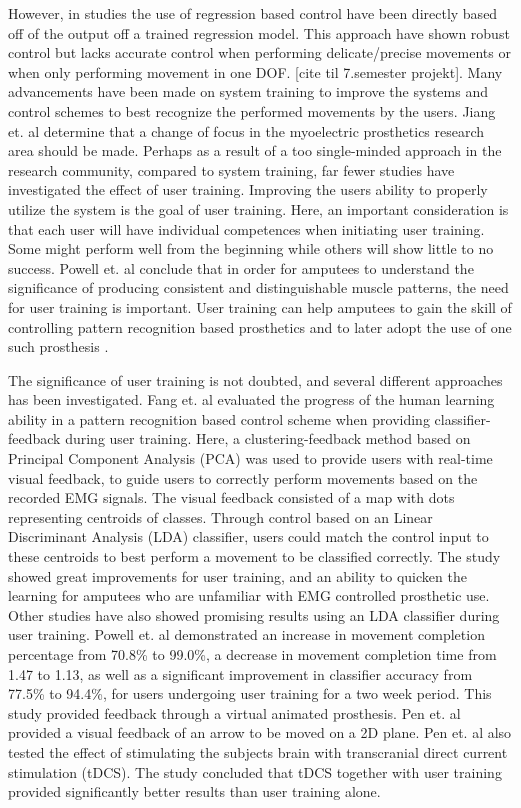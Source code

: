 However, in studies the use of regression based control have been directly based off of the output off a trained regression model. This approach have shown robust control but lacks accurate control when performing delicate/precise movements or when only performing movement in one DOF. [cite til 7.semester projekt]. Many advancements have been made on system training to improve the systems and control schemes to best recognize the performed movements by the users. Jiang et. al \cite{Jiang2012} determine that a change of focus in the myoelectric prosthetics research area should be made. Perhaps as a result of a too single-minded approach in the research community, compared to system training, far fewer studies have investigated the effect of user training. 
Improving the users ability to properly utilize the system is the goal of user training. Here, an important consideration is that each user will have individual competences when initiating user training. Some might perform well from the beginning while others will show little to no success. \cite{Powell2013} Powell et. al \cite{Powell2013} conclude that in order for amputees to understand the significance of producing consistent and distinguishable muscle patterns, the need for user training is important. User training can help amputees to gain the skill of controlling pattern recognition based prosthetics and to later adopt the use of one such prosthesis \cite{Powell2013}.

The significance of user training is not doubted, and several different approaches has been investigated.
Fang et. al \cite{Fang2017} evaluated the progress of the human learning ability in a pattern recognition based control scheme when providing classifier-feedback during user training. Here, a clustering-feedback method based on Principal Component Analysis (PCA) was used to provide users with real-time visual feedback, to guide users to correctly perform movements based on the recorded EMG signals. The visual feedback consisted of a map with dots representing centroids of classes. Through control based on an Linear Discriminant Analysis (LDA) classifier, users could match the control input to these centroids to best perform a movement to be classified correctly. The study showed great improvements for user training, and an ability to quicken the learning for amputees who are unfamiliar with EMG controlled prosthetic use. \cite{Fang2017}
Other studies have also showed promising results using an LDA classifier during user training. Powell et. al \cite{Powell2014} demonstrated an increase in movement completion percentage from 70.8\% to 99.0\%, a decrease in movement completion time from 1.47 to 1.13, as well as a significant improvement in classifier accuracy from 77.5\% to 94.4\%, for users undergoing user training for a two week period. This study provided feedback through a virtual animated prosthesis.
Pen et. al \cite{Pen2017} provided a visual feedback of an arrow to be moved on a 2D plane. Pen et. al also tested the effect of stimulating the subjects brain with transcranial direct current stimulation (tDCS). The study concluded that tDCS together with user training provided significantly better results than user training alone. \cite{Pen2017}

